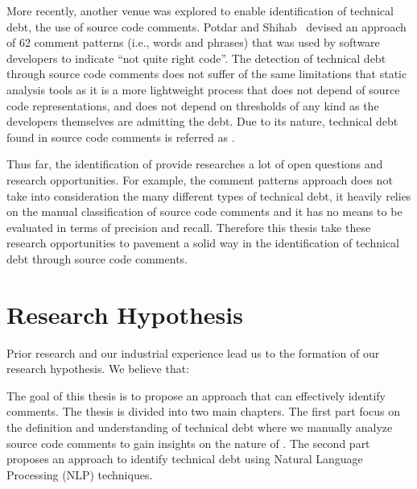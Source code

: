 More recently, another venue was explored to enable identification of technical debt, the use of source code comments. Potdar and Shihab~\cite{Potdar2014ICSME} devised an approach of 62 comment patterns (i.e., words and phrases) that was used by software developers to indicate ``not quite right code''. The detection of technical debt through source code comments does not suffer of the same limitations that static analysis tools as it is a more lightweight process that does not depend of source code representations, and does not depend on thresholds of any kind as the developers themselves are admitting the debt. Due to its nature, technical debt found in source code comments is referred as \emph{\SATD}.

Thus far, the identification of \SATD provide researches a lot of open questions and research opportunities. For example, the comment patterns approach does not take into consideration the many different types of technical debt, it heavily relies on the manual classification of source code comments and it has no means to be evaluated in terms of precision and recall. Therefore this thesis take these research opportunities to pavement a solid way in the identification of technical debt through source code comments. 

\section{Research Hypothesis}

Prior research and our industrial experience lead us to the formation of our research hypothesis. We believe that:


The goal of this thesis is to propose an approach that can effectively identify \SATD comments. The thesis is divided into two main chapters. The first part focus on the definition and understanding of technical debt where we manually analyze source code comments to gain insights on the nature of \SATD. The second part proposes an approach to identify technical debt using Natural Language Processing (NLP) techniques.

